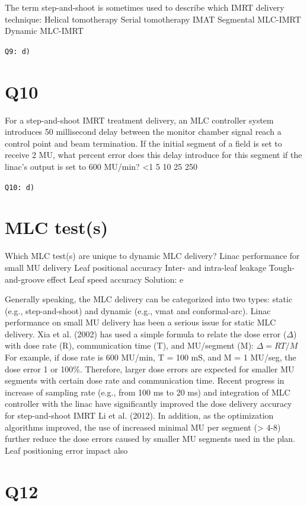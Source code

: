 \documentclass[]{book}
\theoremstyle{definition}
\theoremstyle{definition}
\theoremstyle{definition}
\theoremstyle{remark}
\begin{document}
The term step-and-shoot is sometimes used to describe which IMRT
delivery technique: Helical tomotherapy Serial tomotherapy IMAT
Segmental MLC-IMRT Dynamic MLC-IMRT

\texttt{Q9:\ d)}

\section{Q10}\label{q10}

For a step-and-shoot IMRT treatment delivery, an MLC controller system
introduces 50 millisecond delay between the monitor chamber signal reach
a control point and beam termination. If the initial segment of a field
is set to receive 2 MU, what percent error does this delay introduce for
this segment if the linac's output is set to 600 MU/min? \textless{}1 5
10 25 250

\texttt{Q10:\ d)}

\section{MLC test(s)}\label{mlc-tests}

Which MLC test(s) are unique to dynamic MLC delivery? Linac performance
for small MU delivery Leaf positional accuracy Inter- and intra-leaf
leakage Tough-and-groove effect Leaf speed accuracy Solution: e

Generally speaking, the MLC delivery can be categorized into two types:
static (e.g., step-and-shoot) and dynamic (e.g., vmat and
conformal-arc). Linac performance on small MU delivery has been a
serious issue for static MLC delivery. Xia et al. (2002) has used a
simple formula to relate the dose error (\(\Delta\)) with dose rate (R),
communication time (T), and MU/segment (M): \(\Delta =RT/M\) For
example, if dose rate is 600 MU/min, T = 100 mS, and M = 1 MU/seg, the
dose error 1 or 100\%. Therefore, larger dose errors are expected for
smaller MU segments with certain dose rate and communication time.
Recent progress in increase of sampling rate (e.g., from 100 ms to 20
ms) and integration of MLC controller with the linac have significantly
improved the dose delivery accuracy for step-and-shoot IMRT Li et al.
(2012). In addition, as the optimization algorithms improved, the use of
increased minimal MU per segment (\textgreater{} 4-8) further reduce the
dose errors caused by smaller MU segments used in the plan. Leaf
positioning error impact also

\section{Q12}\label{q12}
\end{document}
